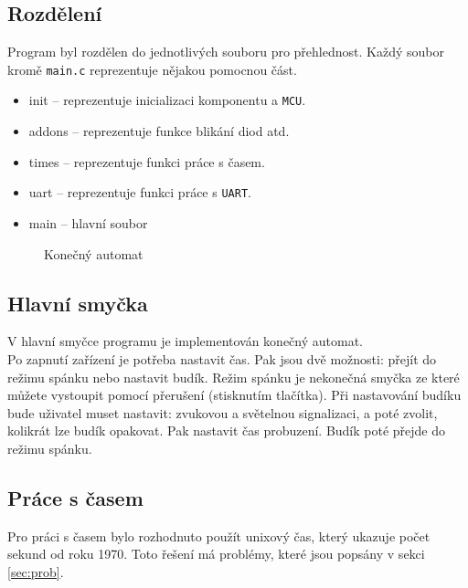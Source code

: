 \documentclass[a4paper,11pt]{article}
\begin{document}
\subsection{Rozdělení}
Program byl rozdělen do jednotlivých souboru pro přehlednost. Každý soubor kromě \texttt{main.c} reprezentuje nějakou pomocnou část. 
\begin{itemize}
    \item init -- reprezentuje inicializaci komponentu a \texttt{MCU}.
    \item addons -- reprezentuje funkce blikání diod atd. 
    \item times -- reprezentuje funkci práce s časem.
    \item uart -- reprezentuje funkci práce s \texttt{UART}.
    \item main -- hlavní soubor
\end{itemize}
\begin{figure}[h]
\caption{Konečný automat}
\label{obrazek:1}
\end{figure}
\subsection{Hlavní smyčka }
V hlavní smyčce programu je implementován konečný automat.\\
Po zapnutí zařízení je potřeba nastavit čas. Pak jsou dvě možnosti: přejít do režimu spánku nebo nastavit budík. Režim spánku je nekonečná smyčka ze které můžete vystoupit pomocí přerušení (stisknutím tlačítka). Při nastavování budíku bude uživatel muset nastavit: zvukovou a světelnou signalizaci, a poté zvolit, kolikrát lze budík opakovat. Pak nastavit čas probuzení. Budík poté přejde do režimu spánku.
\subsection{Práce s časem}
Pro práci s časem bylo rozhodnuto použít unixový čas, který ukazuje počet sekund od roku 1970. Toto řešení má problémy, které jsou popsány v sekci \ref{sec:prob}.
\end{document}
